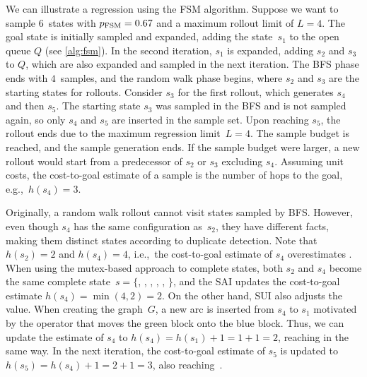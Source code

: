 We can illustrate a regression using the FSM algorithm. Suppose we want to sample $6$~states with $p_{\text{FSM}}=0.67$ and a maximum rollout limit of $L=4$. The goal state is initially sampled and expanded, adding the state~$s_1$ to the open queue $Q$ (see \cref{alg:fsm}). In the second iteration, $s_1$ is expanded, adding $s_2$ and $s_3$ to $Q$, which are also expanded and sampled in the next iteration. The BFS phase ends with $4$~samples, and the random walk phase begins, where $s_2$ and $s_3$ are the starting states for rollouts. Consider $s_3$ for the first rollout, which generates $s_4$ and then $s_5$. The starting state $s_3$ was sampled in the BFS and is not sampled again, so only $s_4$ and $s_5$ are inserted in the sample set. Upon reaching $s_5$, the rollout ends due to the maximum regression limit~$L = 4$. The sample budget is reached, and the sample generation ends. If the sample budget were larger, a new rollout would start from a predecessor of $s_2$ or $s_3$ excluding $s_4$. Assuming unit costs, the cost-to-goal estimate of a sample is the number of hops to the goal, e.g.,~$h(s_4)=3$.

Originally, a random walk rollout cannot visit states sampled by BFS. However, even though $s_4$ has the same configuration as~$s_2$, they have different facts, making them distinct states according to duplicate detection. Note that $h(s_2)=2$ and $h(s_4)=4$, i.e.,~the cost-to-goal estimate of $s_4$ overestimates \hstar. When using the mutex-based approach to complete states, both $s_2$ and $s_4$ become the same complete state~$s = \{$\mbox{}, \mbox{}, \mbox{}, \mbox{}, \mbox{}, \mbox{}$\}$, and the SAI updates the cost-to-goal estimate $h(s_4)=\min(4,2)=2$. On the other hand, SUI also adjusts the value. When creating the graph~$G$, a new arc is inserted from $s_4$ to $s_1$ motivated by the operator that moves the green block onto the blue block. Thus, we can update the estimate of $s_4$ to $h(s_4)=h(s_1)+1=1+1=2$, reaching \hstar in the same way. In the next iteration, the cost-to-goal estimate of $s_5$ is updated to $h(s_5)=h(s_4)+1=2+1=3$, also reaching~\hstar.
